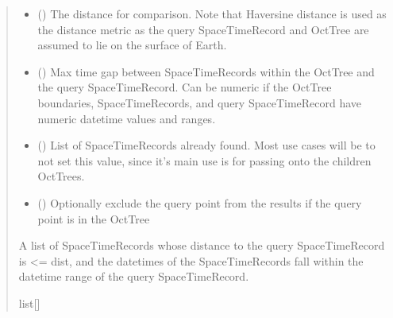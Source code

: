 \documentclass[letterpaper,10pt,english]{sphinxmanual}
\begin{document}
\begin{fulllineitems}
\begin{fulllineitems}
\begin{quote}
\begin{description}
\begin{itemize}
\item {}
\sphinxAtStartPar
{} () \textendash{} The distance for comparison. Note that Haversine distance is used
as the distance metric as the query SpaceTimeRecord and OctTree are
assumed to lie on the surface of Earth.

\item {}
\sphinxAtStartPar
{} () \textendash{} Max time gap between SpaceTimeRecords within the OctTree and the
query SpaceTimeRecord. Can be numeric if the OctTree boundaries,
SpaceTimeRecords, and query SpaceTimeRecord have numeric datetime
values and ranges.

\item {}
\sphinxAtStartPar
{} (\sphinxstyleliteralemphasis{\sphinxupquote{{[}}}{\hyperref[\detokenize{record:GeoSpatialTools.record.SpaceTimeRecord}]{\sphinxcrossref{\sphinxstyleliteralemphasis{\sphinxupquote{SpaceTimeRecord}}}}}\sphinxstyleliteralemphasis{\sphinxupquote{{]} }}\sphinxstyleliteralemphasis{\sphinxupquote{| }}) \textendash{} List of SpaceTimeRecords already found. Most use cases will be to
not set this value, since it’s main use is for passing onto the
children OctTrees.

\item {}
\sphinxAtStartPar
{} () \textendash{} Optionally exclude the query point from the results if the query
point is in the OctTree

\end{itemize}

\sphinxAtStartPar
A list of SpaceTimeRecords whose distance to the
query SpaceTimeRecord is \textless{}= dist, and the datetimes of the
SpaceTimeRecords fall within the datetime range of the query
SpaceTimeRecord.

\sphinxAtStartPar
list{[}{\hyperref[\detokenize{record:GeoSpatialTools.record.SpaceTimeRecord}]{}}{]}

\end{description}\end{quote}


\end{fulllineitems}
\end{fulllineitems}
\end{document}
